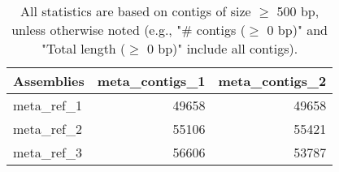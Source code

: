 \documentclass[12pt,a4paper]{article}
\begin{document}
\begin{table}[ht]
\begin{center}
\caption{All statistics are based on contigs of size $\geq$ 500 bp, unless otherwise noted (e.g., "\# contigs ($\geq$ 0 bp)" and "Total length ($\geq$ 0 bp)" include all contigs).}
\begin{tabular}{|l*{2}{|r}|}
\hline
Assemblies & meta\_contigs\_1 & meta\_contigs\_2 \\ \hline
meta\_ref\_1 & 49658 & 49658 \\ \hline
meta\_ref\_2 & 55106 & 55421 \\ \hline
meta\_ref\_3 & 56606 & 53787 \\ \hline
\end{tabular}
\end{center}
\end{table}
\end{document}
